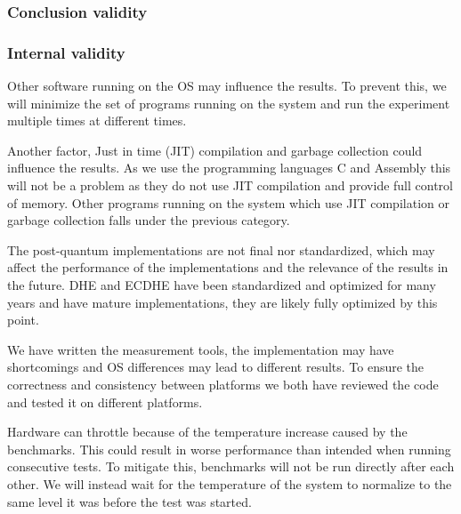 \subsubsection{Conclusion validity}

\subsubsection{Internal validity}
\label{section:method:internal-validity}
Other software running on the OS may influence the results. To prevent this, we will minimize the set of programs running on the system and run the experiment multiple times at different times.

Another factor, Just in time (JIT) compilation and garbage collection could influence the results. As we use the programming languages C and Assembly this will not be a problem as they do not use JIT compilation and provide full control of memory. Other programs running on the system which use JIT compilation or garbage collection falls under the previous category.




The post-quantum implementations are not final nor standardized, which may affect the performance of the implementations and the relevance of the results in the future. DHE and ECDHE have been standardized and optimized for many years and have mature implementations, they are likely fully optimized by this point.

We have written the measurement tools, the implementation may have shortcomings and OS differences may lead to different results. To ensure the correctness and consistency between platforms we both have reviewed the code and tested it on different platforms.

Hardware can throttle because of the temperature increase caused by the benchmarks. This could result in worse performance than intended when running consecutive tests. To mitigate this, benchmarks will not be run directly after each other. We will instead wait for the temperature of the system to normalize to the same level it was before the test was started.

